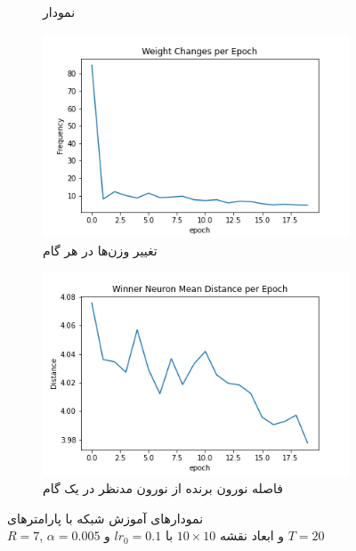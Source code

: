 \documentclass[12pt, a4paper]{article}
\begin{document}
\begin{figure}[h]
\begin{subfigure}{0.45\linewidth}
        \caption{نمودار }
    \end{subfigure}
    \newline
    \begin{subfigure}{0.45\linewidth}
        \includegraphics[width=\linewidth]{images/q5/r14/weight_change.png}
        \caption{تغییر وزن‌ها در هر گام}
    \end{subfigure}
    \hfill
    \begin{subfigure}{0.45\linewidth}
        \includegraphics[width=\linewidth]{images/q5/r14/winner_distance.png}
        \caption{فاصله نورون برنده از نورون مدنظر در یک گام}
    \end{subfigure}
    \caption{نمودار‌های آموزش شبکه  با پارامتر‌های \\$R=7$, $\alpha=0.005$ و ابعاد نقشه $10 \times 10$ با $lr_0=0.1$ و $T=20$}
    \label{r14}
\end{figure}
\end{document}
